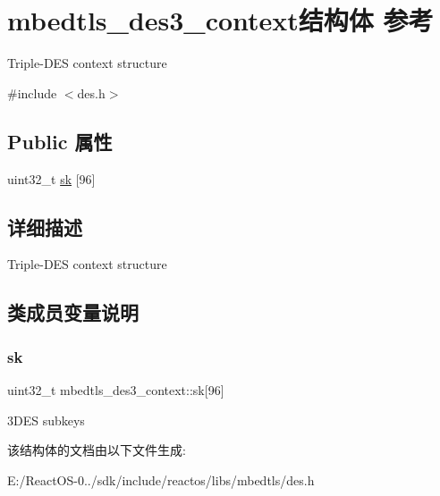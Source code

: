 \hypertarget{structmbedtls__des3__context}{}\section{mbedtls\+\_\+des3\+\_\+context结构体 参考}
\label{structmbedtls__des3__context}


Triple-\/\+D\+ES context structure  




{\ttfamily \#include $<$des.\+h$>$}

\subsection*{Public 属性}
\begin{DoxyCompactItemize}
\item 
uint32\+\_\+t \hyperlink{structmbedtls__des3__context_a59ed9ecb227b3d24bddd3993309fb6b4}{sk} \mbox{[}96\mbox{]}
\end{DoxyCompactItemize}


\subsection{详细描述}
Triple-\/\+D\+ES context structure 

\subsection{类成员变量说明}
\mbox{\label{structmbedtls__des3__context_a59ed9ecb227b3d24bddd3993309fb6b4}} 
\subsubsection{\texorpdfstring{sk}{sk}}
{\footnotesize\ttfamily uint32\+\_\+t mbedtls\+\_\+des3\+\_\+context\+::sk\mbox{[}96\mbox{]}}

3\+D\+ES subkeys 

该结构体的文档由以下文件生成\+:\begin{DoxyCompactItemize}
\item 
E\+:/\+React\+O\+S-\/0../sdk/include/reactos/libs/mbedtls/des.\+h\end{DoxyCompactItemize}
